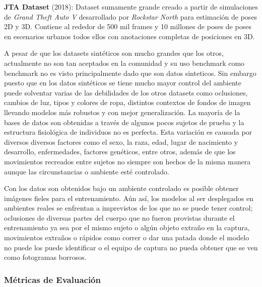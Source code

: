 \textbf{JTA Dataset} (2018): Dataset sumamente grande creado a partir de simulaciones de
\textit{Grand Theft Auto V} desarrollado por \textit{Rockstar North} \cite{fabbri2018learning}
para estimación de poses 2D y 3D. Contiene al
rededor de 500 mil frames y 10 millones de poses de poses en escenarios urbanos todos ellos con
anotaciones completas de posiciones en 3D.

A pesar de que los datasets sintéticos son mucho grandes que los otros, actualmente no son tan
aceptados en la comunidad y su uso benchmark como benchmark no es visto principalmente dado que son
datos sinteticos. Sin embargo puesto que en los datos sintéticos se tiene mucho mayor control
del ambiente puede solventar varias de las debilidades de los otros datasets como oclusiones, cambios
de luz, tipos y colores de ropa, distintos contextos de fondos de imagen llevando modelos más robustos
y con mejor generalización. La mayoría de la bases de datos son obtenidas a través de algunos pocos
sujetos de prueba y la estructura fisiológica de individuos no es perfecta. Esta variación es causada
por diversos diversos factores como el sexo, la raza, edad, lugar de nacimiento y desarrollo,
enfermedades, factores genéticos, entre otros, además de que los movimientos recreados entre sujetos
no siempre son hechos de la misma manera aunque las circunstancias o ambiente esté controlado.

Con los datos son obtenidos bajo un ambiente controlado es posible obtener imágenes fieles para el
entrenamiento. Aún así, los modelos al ser desplegados en ambientes reales
se enfrentan a imprevistos de los que no se puede tener control; oclusiones de diversas partes del
cuerpo que no fueron provistas durante el entrenamiento ya sea por el mismo sujeto o algún objeto
extraño en la captura, movimientos extraños o rápidos como correr o dar una patada donde el modelo
no puede los puede identificar o el equipo de captura no pueda obtener que se ven como fotogramas
borrosos.


\subsubsection{Métricas de Evaluación}

